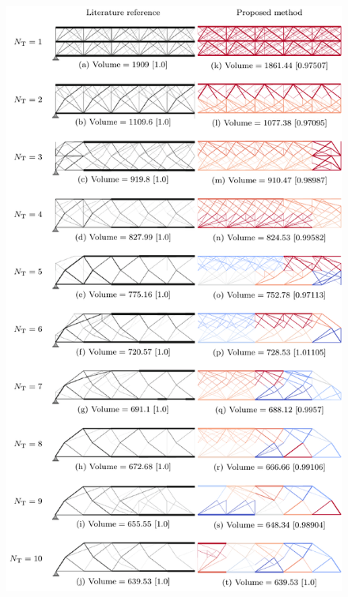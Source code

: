 \begin{figure}
    \centering
    \includegraphics{figures/06_DMO/00_tug_bench/bench.pdf}
    \caption{}
    \label{fig:06}
\end{figure}

